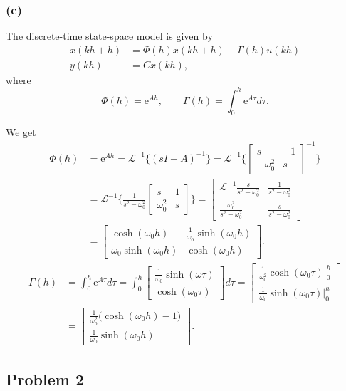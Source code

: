 \documentclass[letterpaper,12pt]{article}
\newcommand{\bbm}{\begin{bmatrix}}
\newcommand{\ebm}{\end{bmatrix}}
\newcommand{\Lap}{\mathcal{L}}
\newcommand*{\mexp}[1]{\ensuremath{\mathrm{e}^{#1}}}
\begin{document}
\subsubsection*{(c)}

The discrete-time state-space model is given by
\begin{equation*}
\begin{aligned}
  x(kh+h) &= \Phi(h) x(kh+h) + \Gamma(h) u(kh)\\
  y(kh) &= C x(kh),
\end{aligned}
\end{equation*}
where 
\[ \Phi(h) = \mexp{Ah}, \qquad \Gamma(h) = \int_0^h \mexp{A\tau} d\tau.\]

We get
\begin{equation*}
\begin{aligned}
  \Phi(h) &= \mexp{Ah} = \Lap^{-1} \{ (sI-A)^{-1}\} =  \Lap^{-1} \{ \bbm s & -1\\ -\omega_0^2 & s\ebm^{-1} \}\\
  &= \Lap^{-1} \{ \frac{1}{s^2 - \omega_0^2} \bbm s & 1\\\omega_0^2 & s\ebm \}
   = \bbm \Lap^{-1} \frac{s}{s^2 - \omega_0^2} & \frac{1}{s^2 - \omega_0^2}\\\frac{\omega_0^2}{s^2 - \omega_0^2} & \frac{s}{s^2 - \omega_0^2}\ebm\\
   &= \bbm \cosh(\omega_0 h) & \frac{1}{\omega_0} \sinh(\omega_0 h)\\\omega_0 \sinh(\omega_0 h) & \cosh(\omega_0 h) \ebm.
 \end{aligned}
\end{equation*}
\begin{equation*}
\begin{aligned}
  \Gamma(h) &= \int_0^h \mexp{A\tau} d\tau = \int_0^h \bbm \frac{1}{\omega_0} \sinh(\omega\tau)\\ \cosh(\omega_0 \tau) \ebm d\tau
  = \bbm  \frac{1}{\omega_0^2} \cosh(\omega_0\tau) \Big|_0^h\\[3mm]  \frac{1}{\omega_0}\sinh(\omega_0\tau) \Big|_0^h\ebm \\
  &= \bbm \frac{1}{\omega_0^2}\big( \cosh(\omega_0 h) - 1 \big)\\ \frac{1}{\omega_0} \sinh(\omega_0h) \ebm. 
\end{aligned}
\end{equation*}

\subsection*{Problem 2}
\end{document}
